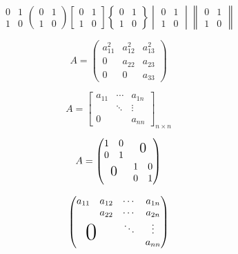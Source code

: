 \documentclass{article}
\begin{document}
    \[
    \begin{matrix}
        0 & 1 \\
        1 & 0
    \end{matrix}    
    \begin{pmatrix}
        0 & 1 \\
        1 & 0
    \end{pmatrix}  
    \begin{bmatrix}
        0 & 1 \\
        1 & 0
    \end{bmatrix}  
    \begin{Bmatrix}
        0 & 1 \\
        1 & 0
    \end{Bmatrix}  
    \begin{vmatrix}
        0 & 1 \\
        1 & 0
    \end{vmatrix}  
    \begin{Vmatrix}
        0 & 1 \\
        1 & 0
    \end{Vmatrix}  
    \]

    \[
    A = \begin{pmatrix}
        a_{11}^2 & a_{12}^2 & a_{13}^2 \\
        0 & a_{22} & a_{23} \\
        0 & 0 & a_{33}
    \end{pmatrix}  
    \]

    \[
    A = \begin{bmatrix}
        a_{11} & \cdots & a_{1n} \\
        & \ddots & \vdots \\
        0 & & a_{nn}
    \end{bmatrix}_{n \times n}
    \]

    \[
    A = \begin{pmatrix}
        \begin{matrix} 1&0\\0&1 \end{matrix} & \text{\Large 0} \\
        \text{\Large 0} & \begin{matrix} 1&0\\0&1 \end{matrix}
    \end{pmatrix}  
    \]

    \[
    \begin{pmatrix}
        a_{11} & a_{12} & \cdots & a_{1n} \\
        & a_{22} & \cdots & a_{2n} \\
        &        & \ddots & \vdots \\
        \multicolumn{2}{c}{\raisebox{1.3ex}[0pt]{\Huge 0 }}
        & & a_{nn}
    \end{pmatrix}    
    \]
\end{document}
